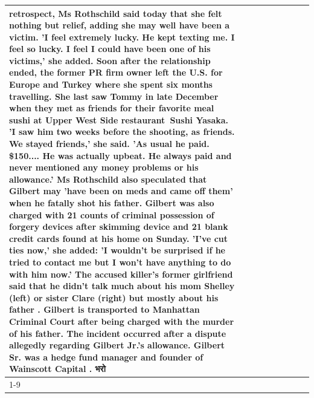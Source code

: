 \begin{table}[H]
\begin{tabular}{lllrlllll}
retrospect, Ms Rothschild said today that she felt nothing but relief, adding she may well have been a victim. 'I feel extremely lucky. He kept texting me. I feel so lucky. I feel I could have been one of his victims,' she added. Soon after the relationship ended, the former PR firm owner left the U.S. for Europe and Turkey where she spent six months  travelling. She last saw Tommy in late December when they met as friends for their favorite meal sushi at Upper West Side restaurant Sushi Yasaka. 'I saw him two weeks before the shooting, as friends. We stayed friends,' she said. 'As usual he paid. \$150.... He was actually upbeat. He always paid and never mentioned any money problems or his allowance.' Ms Rothschild also speculated that Gilbert may 'have been on meds and came off them' when he fatally shot his father. Gilbert was also charged with 21 counts of criminal possession of forgery devices after skimming device and 21 blank credit cards found at his home on Sunday. 'I've cut ties now,' she added: 'I wouldn’t be surprised if he tried to contact me but I won’t have anything to do with him now.' The accused killer's former girlfriend said that he didn't talk much about his mom Shelley (left) or sister Clare (right) but mostly about his father . Gilbert is transported to Manhattan Criminal Court  after being charged with the murder of his father. The incident occurred after a dispute allegedly regarding Gilbert Jr.'s allowance. Gilbert Sr. was a hedge fund manager and founder of Wainscott Capital . भरो \\
\cline{1-9}

\end{tabular}
\end{table}
